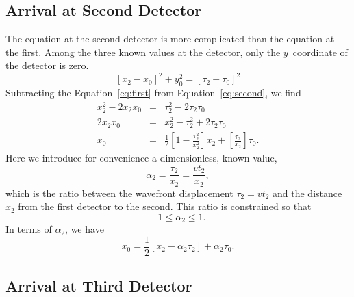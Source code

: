 \documentclass[twocolumn]{article}
\begin{document}
\subsection{Arrival at Second Detector}

The equation at the second detector is more complicated than the equation at
the first.  Among the three known values at the detector, only the
$y$~coordinate of the detector is zero.
\begin{equation}
   \left[x_2 - x_0\right]^2 + y_0^2 = \left[\tau_2 - \tau_0\right]^2
   \label{eq:second}
\end{equation}
Subtracting the Equation~\ref{eq:first} from Equation~\ref{eq:second}, we find
\begin{eqnarray}
   \nonumber
   x_2^2 - 2 x_2 x_0 &=& \tau_2^2 - 2 \tau_2 \tau_0\\
   \nonumber
   2 x_2 x_0 &=& x_2^2 - \tau_2^2 + 2 \tau_2 \tau_0\\
   x_0 &=& \frac{1}{2}\left[1 - \frac{\tau_2^2}{x_2^2}\right] x_2 +
           \left[\frac{\tau_2}{x_2}\right] \tau_0.
\end{eqnarray}
Here we introduce for convenience a dimensionless, known value,
\begin{equation}
   \alpha_2 = \frac{\tau_2}{x_2} = \frac{v t_2}{x_2},
\end{equation}
which is the ratio between the wavefront displacement $\tau_2 = vt_2$ and the
distance $x_2$ from the first detector to the second.  This ratio is constrained
so that
\begin{equation}
   -1 \leq \alpha_2 \leq 1.
\end{equation}
In terms of $\alpha_2$, we have
\begin{equation}
   x_0 = \frac{1}{2}\left[x_2 - \alpha_2\tau_2\right] + \alpha_2\tau_0.
   \label{eq:t-x}
\end{equation}

\subsection{Arrival at Third Detector}
\end{document}
